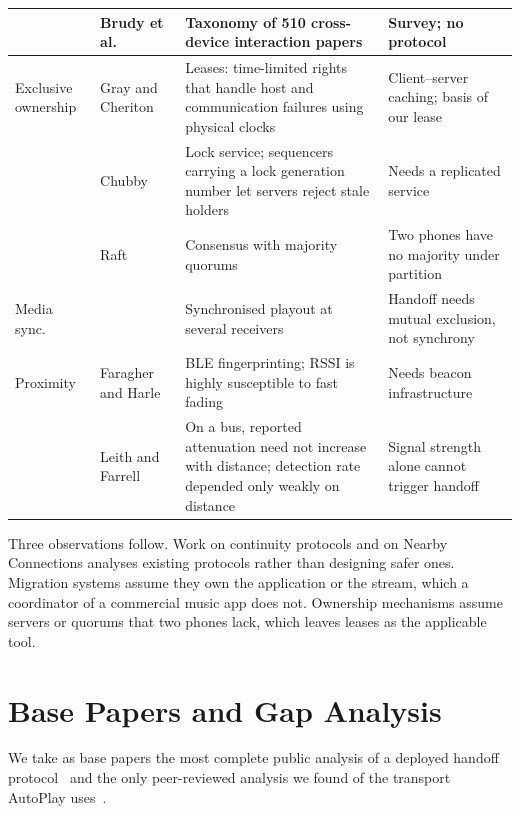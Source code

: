 \documentclass[conference]{IEEEtran}
\begin{document}
\begin{table}[t]
\begin{tabularx}{\textwidth}{@{}L{2.2cm}L{3.4cm}YY@{}}
 & Brudy et al.~\cite{brudy2019} & Taxonomy of 510 cross-device interaction papers & Survey; no protocol \\
\midrule
Exclusive ownership & Gray and Cheriton~\cite{gray1989} & Leases: time-limited rights that handle host and communication failures using physical clocks & Client--server caching; basis of our lease \\
 & Chubby~\cite{chubby2006} & Lock service; sequencers carrying a lock generation number let servers reject stale holders & Needs a replicated service \\
 & Raft~\cite{raft2014} & Consensus with majority quorums & Two phones have no majority under partition \\
\midrule
Media sync. & \cite{montagud2012,rfc7272} & Synchronised playout at several receivers & Handoff needs mutual exclusion, not synchrony \\
\midrule
Proximity & Faragher and Harle~\cite{faragher2015} & BLE fingerprinting; RSSI is highly susceptible to fast fading & Needs beacon infrastructure \\
 & Leith and Farrell~\cite{leith2020} & On a bus, reported attenuation need not increase with distance; detection rate depended only weakly on distance & Signal strength alone cannot trigger handoff \\
\bottomrule
\end{tabularx}
\end{table}

Three observations follow. Work on continuity protocols and on Nearby Connections analyses existing protocols rather than designing safer ones. Migration systems assume they own the application or the stream, which a coordinator of a commercial music app does not. Ownership mechanisms assume servers or quorums that two phones lack, which leaves leases as the applicable tool.

\section{Base Papers and Gap Analysis}\label{sec:base}

We take as base papers the most complete public analysis of a deployed handoff protocol~\cite{stute2021} and the only peer-reviewed analysis we found of the transport AutoPlay uses~\cite{antonioli2019}.
\end{document}
